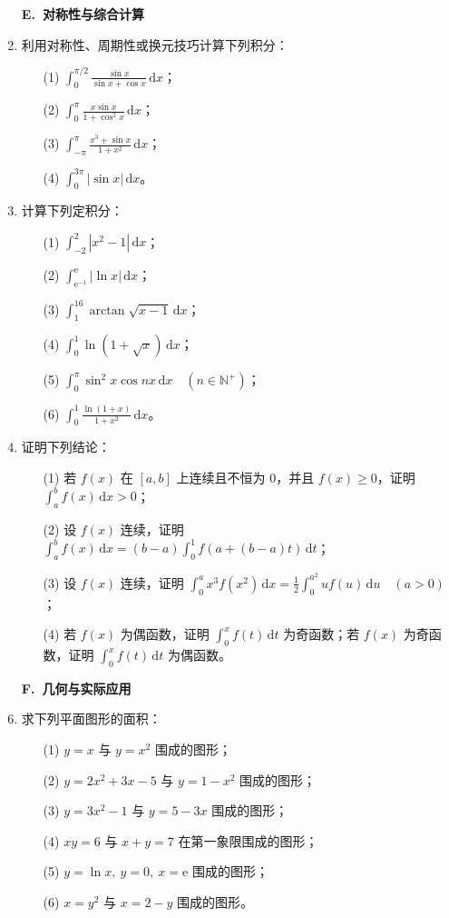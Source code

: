 \documentclass[fontset=fandol]{ctexart}
\newcommand{\dd}{\mathrm{d}}
\newcommand{\ee}{\mathrm{e}}
\begin{document}
\begin{enumerate}
\item[]\textbf{E.\ 对称性与综合计算}
\setcounter{enumi}{0}
\item 利用对称性、周期性或换元技巧计算下列积分：
\begin{enumerate}
\item[(1)] $\displaystyle \int_0^{\pi/2}\frac{\sin x}{\sin x+\cos x}\,\dd x$；
\item[(2)] $\displaystyle \int_0^\pi\frac{x\sin x}{1+\cos^2x}\,\dd x$；
\item[(3)] $\displaystyle \int_{-\pi}^{\pi}\frac{x^3+\sin x}{1+x^2}\,\dd x$；
\item[(4)] $\displaystyle \int_0^{3\pi}|\sin x|\,\dd x$。
\end{enumerate}

\item 计算下列定积分：
\begin{enumerate}
\item[(1)] $\displaystyle \int_{-2}^{2}|x^2-1|\,\dd x$；
\item[(2)] $\displaystyle \int_{\ee^{-1}}^{\ee}|\ln x|\,\dd x$；
\item[(3)] $\displaystyle \int_1^{16}\arctan\sqrt{x-1}\,\dd x$；
\item[(4)] $\displaystyle \int_0^1\ln(1+\sqrt{x})\,\dd x$；
\item[(5)] $\displaystyle \int_0^{\pi}\sin^2x\cos nx\,\dd x\quad(n\in\mathbb N^+)$；
\item[(6)] $\displaystyle \int_0^1\frac{\ln(1+x)}{1+x^2}\,\dd x$。
\end{enumerate}

\item 证明下列结论：
\begin{enumerate}
\item[(1)] 若 $f(x)$ 在 $[a,b]$ 上连续且不恒为 $0$，并且 $f(x)\geq0$，证明 $\displaystyle \int_a^b f(x)\,\dd x>0$；
\item[(2)] 设 $f(x)$ 连续，证明 $\displaystyle \int_a^b f(x)\,\dd x=(b-a)\int_0^1f(a+(b-a)t)\,\dd t$；
\item[(3)] 设 $f(x)$ 连续，证明 $\displaystyle \int_0^a x^3f(x^2)\,\dd x=\frac12\int_0^{a^2}uf(u)\,\dd u\quad(a>0)$；
\item[(4)] 若 $f(x)$ 为偶函数，证明 $\displaystyle \int_0^x f(t)\,\dd t$ 为奇函数；若 $f(x)$ 为奇函数，证明 $\displaystyle \int_0^x f(t)\,\dd t$ 为偶函数。
\end{enumerate}

\item[]\textbf{F.\ 几何与实际应用}
\setcounter{enumi}{0}
\item 求下列平面图形的面积：
\begin{enumerate}
\item[(1)] $y=x$ 与 $y=x^2$ 围成的图形；
\item[(2)] $y=2x^2+3x-5$ 与 $y=1-x^2$ 围成的图形；
\item[(3)] $y=3x^2-1$ 与 $y=5-3x$ 围成的图形；
\item[(4)] $xy=6$ 与 $x+y=7$ 在第一象限围成的图形；
\item[(5)] \(y=\ln x,\ y=0,\ x=\ee\) 围成的图形；
\item[(6)] $x=y^2$ 与 $x=2-y$ 围成的图形。
\end{enumerate}


\end{enumerate}
\end{document}
